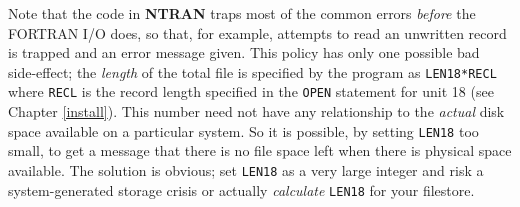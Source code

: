 \begin{description}
Note that the code in {\bf NTRAN} traps most of the common errors
{\em before} the FORTRAN I/O does, so that, for example, attempts to
read an unwritten record is trapped and an error message given. This
policy has only one possible bad side-effect; the {\em length} of
the total file is specified by the program as {\tt LEN18*RECL}
where {\tt RECL} is the record length specified in the {\tt OPEN}
statement for unit 18 (see Chapter \ref{install}). This number need
not have any relationship to the {\em actual}  disk space available
on a particular system. So it is possible, by setting {\tt LEN18}
too small, to get a message that there is no file space left when
there is physical space available. The solution is obvious; set {\tt LEN18}
as a very large integer and risk a system-generated storage crisis or
actually {\em calculate} {\tt LEN18} for your filestore.


\end{description}
